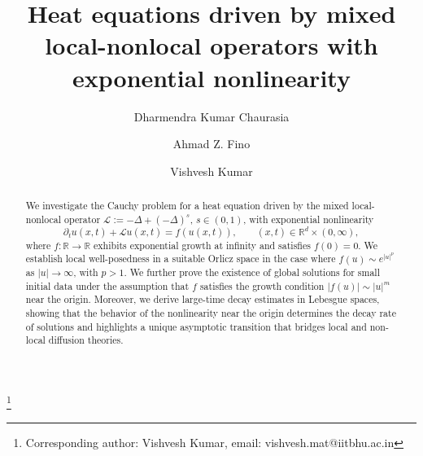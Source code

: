 \documentclass[a4paper,11pt]{amsart}
\numberwithin{equation}{section}
\theoremstyle{plain}
\theoremstyle{definition}
\begin{document}
\title[local-nonlocal heat equation with exponential nonlinearity]
{Heat equations driven by mixed local-nonlocal operators with exponential nonlinearity  }

\author[D. K. Chaurasia]{Dharmendra Kumar Chaurasia}
\address{
  Dharmendra Kumar Chaurasia:
  \endgraf Department of Mathematics,\endgraf 
		Banaras Hindu University
		Varanasi, \endgraf Uttar Pradesh, 221005, India.
   {\rm  mkc0560@bhu.ac.in}
  }

\author[A. Z. Fino]{Ahmad Z. Fino}
\address{
 Ahmad Z. Fino:
  \endgraf College of Engineering and Technology,\endgraf 
		American University of the Middle East,\endgraf 
		 Egaila 54200, Kuwait.
   {\rm  ahmad.fino@aum.edu.kw}
  }
  

\author[V. Kumar]{Vishvesh Kumar}
\address{
  Vishvesh Kumar:
  \endgraf Department of Mathematical Sciences,\endgraf 
		Indian Institute of Technology (BHU),
		Varanasi, \endgraf Uttar Pradesh, 221005, India.
   {\rm  vishveshmishra@gmail.com; vishvesh.mat@iitbhu.ac.in}
  }


\thanks{Corresponding author: Vishvesh Kumar, email: vishvesh.mat@iitbhu.ac.in}


\begin{abstract} 
We investigate the Cauchy problem for a heat equation driven by the mixed local-nonlocal operator $\mathcal{L}:=-\Delta+(-\Delta)^s$, $s\in(0,1)$, with exponential nonlinearity
\[
\partial_tu(x,t)+\mathcal{L}u(x,t)=f(u(x,t)),
\qquad (x,t)\in \mathbb{R}^{d}\times(0,\infty),
\]
where $f:\mathbb{R}\to\mathbb{R}$ exhibits exponential growth at infinity and satisfies $f(0)=0$. 
We establish local well-posedness in a suitable Orlicz space in the case where $f(u)\sim e^{|u|^p}$ as $|u|\to\infty$, with $p>1$. 
We further prove the existence of global solutions for small initial data under the assumption that $f$ satisfies the growth condition $|f(u)|\sim |u|^m$ near the origin.  Moreover, we derive large-time decay estimates in Lebesgue spaces, showing that the behavior of the nonlinearity near the origin determines the decay rate of solutions and highlights a unique asymptotic transition that bridges local and non-local diffusion theories.
\end{abstract}
\maketitle
\allowdisplaybreaks
\end{document}
